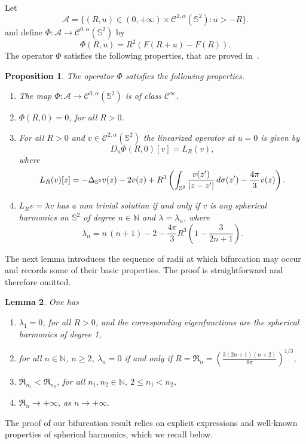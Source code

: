 \documentclass[10pt,reqno,english]{amsart}
\newcommand{\Sd}{\mathbb{S}^2}
\newcommand{\N}{\mathbb{N}}
\newcommand{\be}{\begin{equation}}
\newcommand{\ee}{\end{equation}}
\newtheorem{lemma}{Lemma}[section]
\newtheorem{prop}[lemma]{Proposition}
\theoremstyle{definition}
\numberwithin{equation}{section}
\begin{document}
Let 
\[
\mathcal A=\{(R,u)\in(0,+\infty)\times\mathcal C^{2,\alpha}(\Sd):u>-R\}.
\]
and define $\Phi:\mathcal A\to\mathcal C^{0,\alpha}(\Sd)$ by
\be
\label{defPhi}
\Phi(R,u)= R^2 \left( F(R+u)-F(R) \right).
\ee
The operator $\Phi$ satisfies the following properties, that are proved in~\cite[Proposition 7 and 8]{Fr19}.

\begin{prop}
The operator $\Phi$ satisfies the following properties.
\begin{enumerate}
\item The map $\Phi:\mathcal A\to\mathcal C^{0,\alpha}(\Sd)$ is of class $\mathcal C^\infty$.
\item $\Phi(R,0)=0$, for all $R>0$.
\item For all $R>0$ and $v\in\mathcal C^{2,\alpha}(\Sd)$ the linearized operator at $u=0$ is given by
\[
D_u\Phi(R,0)[v]=L_R(v),
\]
where
\[
L_R(v)[z]= -\Delta_{\Sd} v(z) - 2 v(z) +R^3 \left( \int_{\Sd} {v (z') \over |z-z'| }\,d\sigma(z') -\frac{4\pi}{3} v(z)\right).
\]
\item $L_R v=\lambda v$ has a non trivial solution if and only if $v$ is any spherical harmonics on $\Sd$ of degree $n\in\N$ and $\lambda=\lambda_n$, where
\[
\lambda_n=n \, (n+1)-2-\frac{4\pi}{3}R^3\left(1-\frac{3}{2n+1}\right).
\]
\end{enumerate}
\end{prop}

The next lemma introduces the sequence of radii at which bifurcation may occur and records some of their basic properties. The proof is straightforward and therefore omitted.

\begin{lemma}
\label{lemma:autov-3d}
One has
\begin{enumerate}
\item $\lambda_1=0$, for all $R>0$, and the corresponding eigenfunctions are the spherical harmonics of degree 1,
\item for all $n\in\N$, $n\ge2$, $\lambda_n=0$ if and only if $R=\mathfrak R_n=\left(\frac{3(2n+1)(n+2)}{8\pi}\right)^{1/3}$,
\item $\mathfrak R_{n_1}<\mathfrak R_{n_2}$, for all  $n_1,n_2\in\N$, $2\leq n_1<n_2$,
\item $\mathfrak R_n\to+\infty$, as $n\to+\infty.$
\end{enumerate}
\end{lemma}


The proof of our bifurcation result relies on explicit expressions and  well-known properties of spherical harmonics, which we recall below.
\end{document}
